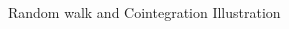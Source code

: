 \documentclass{beamer}
\begin{document}
\begin{frame}[t,fragile]{Random walk and Cointegration Illustration}
\begin{columns}
\begin{column}{.08\linewidth}
\end{column}
\end{columns}
\end{frame}
\end{document}
